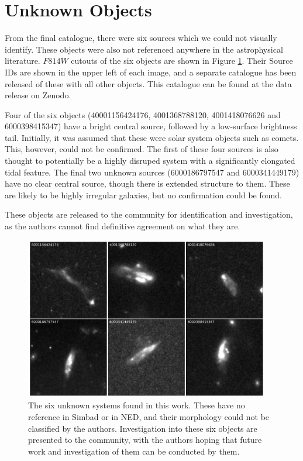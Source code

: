\section{Unknown Objects}\label{unknown-object}
\noindent From the final catalogue, there were six sources which we could not visually identify. These objects were also not referenced anywhere in the astrophysical literature. $F814W$ cutouts of the six objects are shown in Figure \ref{fig:unknown-images}. Their Source IDs are shown in the upper left of each image, and a separate catalogue has been released of these with all other objects. This catalogue can be found at the data release on Zenodo.

Four of the six objects (40001156424176, 4001368788120, 4001418076626 and 6000398415347) have a bright central source, followed by a low-surface brightness tail. Initially, it was assumed that these were solar system objects such as comets. This, however, could not be confirmed. The first of these four sources is also thought to potentially be a highly disruped system with a significantly elongated tidal feature. The final two unknown sources (6000186797547 and 6000341449179) have no clear central source, though there is extended structure to them. These are likely to be highly irregular galaxies, but no confirmation could be found.

These objects are released to the community for identification and investigation, as the authors cannot find definitive agreement on what they are. 

\begin{figure}
  \centering
  \includegraphics[width = 0.95\textwidth]{Chapter2/figures/fig17.pdf}
  \caption[The six unknown systems found in this work.]{The six unknown systems found in this work. These have no reference in Simbad or in NED, and their morphology could not be classified by the authors. Investigation into these six objects are presented to the community, with the authors hoping that future work and investigation of them can be conducted by them.}
  \label{fig:unknown-images}
\end{figure}

